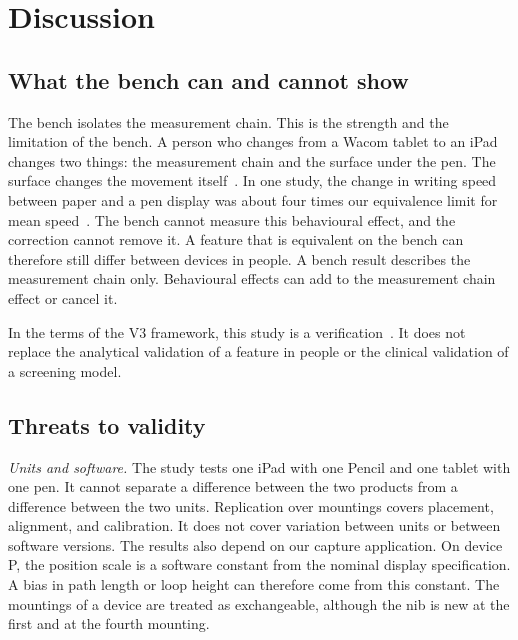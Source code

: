 \section{Discussion}
\label{sec:discussion}

\subsection{What the bench can and cannot show}
The bench isolates the measurement chain.
This is the strength and the limitation of the bench.
A person who changes from a Wacom tablet to an iPad changes two things: the measurement chain and the surface under the pen.
The surface changes the movement itself~\cite{Alamargot2015,Gerth2016b}.
In one study, the change in writing speed between paper and a pen display was about four times our equivalence limit for mean speed~\cite{Gerth2016b}.
The bench cannot measure this behavioural effect, and the correction cannot remove it.
A feature that is equivalent on the bench can therefore still differ between devices in people.
A bench result describes the measurement chain only.
Behavioural effects can add to the measurement chain effect or cancel it.

In the terms of the V3 framework, this study is a verification~\cite{Goldsack2020}.
It does not replace the analytical validation of a feature in people or the clinical validation of a screening model.

\subsection{Threats to validity}
\emph{Units and software.}
The study tests one iPad with one Pencil and one tablet with one pen.
It cannot separate a difference between the two products from a difference between the two units.
Replication over mountings covers placement, alignment, and calibration.
It does not cover variation between units or between software versions.
The results also depend on our capture application.
On device P, the position scale is a software constant from the nominal display specification.
A bias in path length or loop height can therefore come from this constant.
The mountings of a device are treated as exchangeable, although the nib is new at the first and at the fourth mounting.

